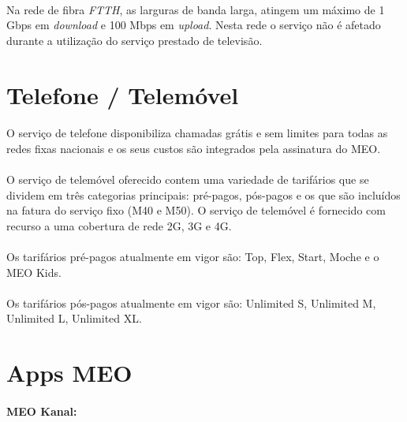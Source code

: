 \documentclass{report}
\begin{document}
\paragraph{}Na rede de fibra \textit{FTTH}, as larguras de banda larga, atingem um máximo de 1 Gbps em \textit{download} e 100 Mbps em \textit{upload}. Nesta rede o serviço não é afetado durante a utilização do serviço prestado de televisão.

\section{Telefone / Telemóvel}

\paragraph{}O serviço de telefone disponibiliza chamadas grátis e sem limites para todas as redes fixas nacionais e os seus custos são integrados pela assinatura do MEO.

\paragraph{}O serviço de telemóvel oferecido contem uma variedade de tarifários que se dividem em três categorias principais: pré-pagos, pós-pagos e os que são incluídos na fatura do serviço fixo (M40 e M50). O serviço de telemóvel é fornecido com recurso a uma cobertura de rede 2G, 3G e 4G.
\paragraph{}Os tarifários pré-pagos atualmente em vigor são: Top, Flex, Start, Moche e o MEO Kids.

\paragraph{}Os tarifários pós-pagos atualmente em vigor são: Unlimited S, Unlimited M, Unlimited L, Unlimited XL.

\newpage
 
\section{Apps MEO}

\paragraph{MEO Kanal:}
\end{document}
